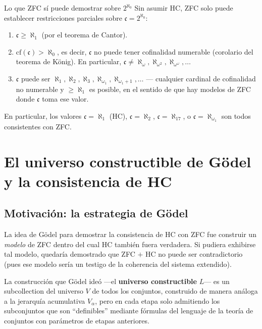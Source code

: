 \begin{ejemplo}{Lo que ZFC sí puede demostrar sobre $2^{\aleph_0}$}{}
Sin asumir HC, ZFC solo puede establecer restricciones parciales sobre $\mathfrak{c} = 2^{\aleph_0}$:
\begin{enumerate}[leftmargin=2em, label=(\alph*)]
  \item $\mathfrak{c} \geq \aleph_1$ (por el teorema de Cantor).
  \item $\mathrm{cf}(\mathfrak{c}) > \aleph_0$, es decir, $\mathfrak{c}$ no puede tener cofinalidad numerable (corolario del teorema de König). En particular, $\mathfrak{c} \neq \aleph_\omega, \aleph_{\omega^2}, \aleph_{\omega^\omega}, \ldots$
  \item $\mathfrak{c}$ puede ser $\aleph_1, \aleph_2, \aleph_3, \aleph_{\omega_1}, \aleph_{\omega_1 + 1}, \ldots$ --- cualquier cardinal de cofinalidad no numerable y $\geq \aleph_1$ es posible, en el sentido de que hay modelos de ZFC donde $\mathfrak{c}$ toma ese valor.
\end{enumerate}
En particular, los valores $\mathfrak{c} = \aleph_1$ (HC), $\mathfrak{c} = \aleph_2$, $\mathfrak{c} = \aleph_{17}$, o $\mathfrak{c} = \aleph_{\omega_1}$ son todos consistentes con ZFC.
\end{ejemplo}

\section{El universo constructible de Gödel y la consistencia de HC}

\subsection{Motivación: la estrategia de Gödel}

La idea de Gödel para demostrar la consistencia de HC con ZFC fue construir un \emph{modelo} de ZFC dentro del cual HC también fuera verdadera. Si pudiera exhibirse tal modelo, quedaría demostrado que ZFC $+$ HC no puede ser contradictorio (pues ese modelo sería un testigo de la coherencia del sistema extendido).

La construcción que Gödel ideó —el \textbf{universo constructible} $L$— es un subcollection del universo $V$ de todos los conjuntos, construido de manera análoga a la jerarquía acumulativa $V_\alpha$, pero en cada etapa solo admitiendo los subconjuntos que son ``definibles'' mediante fórmulas del lenguaje de la teoría de conjuntos con parámetros de etapas anteriores.

